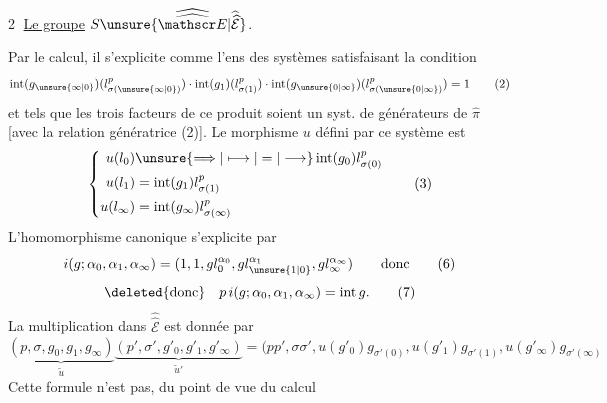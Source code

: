 \textcircled{2} \uline{Le groupe} $S\unsure{\widehat{\widehat{\mathscr E}}|\widehat{\widehat{\mathcal E}}}$.

Par le calcul, il s'explicite comme l'ens des systèmes
satisfaisant la condition
\[
\operatorname{int}(g_{\unsure{\infty|0}})(l_{\sigma(\unsure{\infty|0})}^{p})\cdot\operatorname{int}(g_1)(l_{\sigma(1)}^{p})\cdot\operatorname{int}(g_{\unsure{0|\infty}})(l_{\sigma(\unsure{0|\infty})}^{p})=1\tag*{(2)}
\]
et tels que les trois facteurs de ce produit soient un syst. de générateurs de $\widehat\pi$ [avec la relation génératrice (2)]. Le morphisme $u$ défini par ce  système est
\[
\left\{\begin{aligned}
u(l_0)&\unsure{\Longrightarrow|\longmapsto|=|\longrightarrow}\operatorname{int}(g_0)l_{\sigma(0)}^p\\
u(l_1)&=\operatorname{int}(g_1)l_{\sigma(1)}^p\\
u(l_\infty)&=\operatorname{int}(g_\infty)l_{\sigma(\infty)}^p
\end{aligned}\right.\tag*{(3)}
\]
L'homomorphisme canonique
s'explicite par
\[
i(g;\alpha_0,\alpha_1,\alpha_\infty)=(1,1,g l_0^{\alpha_0},g l_{\unsure{1|0}}^{\alpha_1},g l_\infty^{\alpha_\infty})\qquad\text{donc}\tag*{(6)}
\]
\[
\deleted{\text{donc}}\quad p\,i(g;\alpha_0,\alpha_1,\alpha_\infty)=\operatorname{int}g.\tag*{(7)}
\]
La multiplication dans $\widehat{\widehat{\mathscr E}}$ est donnée par
\[
\underbrace{(p,\sigma,g_0,g_1,g_\infty)}_{\widetilde u}\underbrace{(p',\sigma',g'_0,g'_1,g'_\infty)}_{\widetilde u'}=(pp',\sigma\sigma',u(g'_0)g_{\sigma'(0)},u(g'_1)g_{\sigma'(1)},u(g'_\infty)g_{\sigma'(\infty)}\tag*{(8)}
\]
Cette formule n'est pas, du point de vue du calcul

